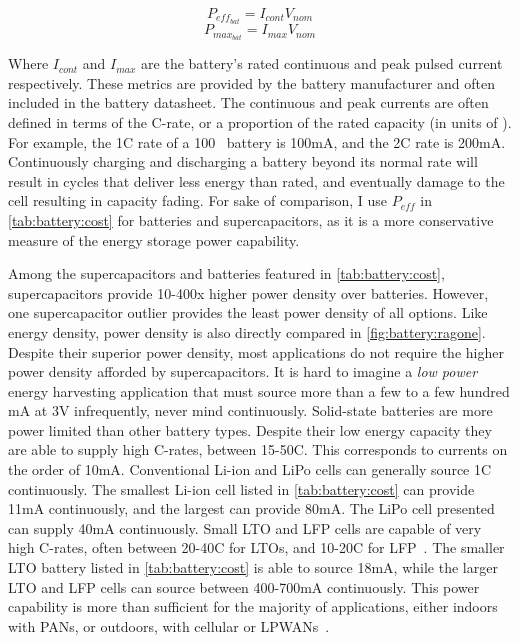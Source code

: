 $$P_{eff_{bat}} = I_{cont} V_{nom}$$
$$P_{max_{bat}} = I_{max} V_{nom}$$

\noindent Where $I_{cont}$ and $I_{max}$ are the battery's rated continuous and peak pulsed current respectively. These metrics are provided by the battery manufacturer and often included in the battery datasheet. The continuous and peak currents are often defined in terms of the C-rate, or a proportion of the rated capacity (in units of \si{\Ah}). For example, the 1C rate of a 100\si{\milli\Ah} battery is 100\si{\milli\ampere}, and the 2C rate is 200\si{\milli\ampere}. 
Continuously charging and discharging a battery beyond its normal rate will result in cycles that deliver less energy than rated, and eventually damage to the cell resulting in capacity fading. 
For sake of comparison, I use $P_{eff}$ in \cref{tab:battery:cost} for batteries and supercapacitors, as it is a more conservative measure of the energy storage power capability. 

Among the supercapacitors and batteries featured in \cref{tab:battery:cost}, supercapacitors provide 10-400x higher power density over batteries. 
However, one supercapacitor outlier provides the least power density of all options. Like energy density, power density is also directly compared in \cref{fig:battery:ragone}.
Despite their superior power density, most applications do not require the higher power density afforded by supercapacitors. 
It is hard to imagine a \textit{low power} energy harvesting application that must source more than a few to a few hundred \si{\milli\ampere} at 3\si{\volt} infrequently, never mind continuously. 
Solid-state batteries are more power limited than other battery types. Despite their low energy capacity they are able to supply high C-rates, between 15-50C. This corresponds to currents on the order of 10\si{\milli\ampere}.
Conventional Li-ion and LiPo cells can generally source 1C continuously. The smallest Li-ion cell listed in \cref{tab:battery:cost} can provide 11\si{\milli\ampere} continuously, and the largest can provide 80\si{\milli\ampere}. The LiPo cell presented can supply 40\si{\milli\ampere} continuously. 
Small LTO and LFP cells are capable of very high C-rates, often between 20-40C for LTOs, and 10-20C for LFP~\cite{lifepo4Datasheet,LTODatasheet,LTODatasheet2}.
The smaller LTO battery listed in \cref{tab:battery:cost} is able to source 18\si{\milli\ampere}, while the larger LTO and LFP cells can source between 400-700\si{\milli\ampere} continuously. 
This power capability is more than sufficient for the majority of applications, either indoors with PANs, or outdoors, with cellular or LPWANs~\cite{nrf52840,ghena2019challenge}.

